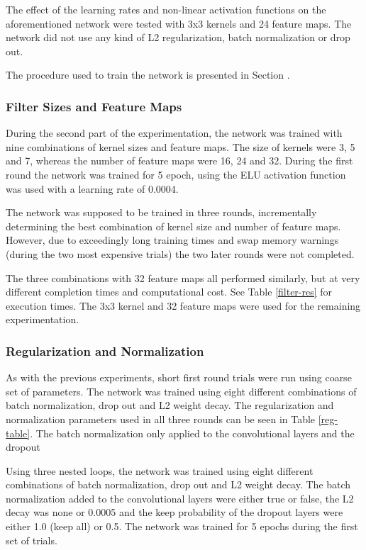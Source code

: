 \documentclass[]{article}
\begin{document}
The effect of the learning rates and non-linear activation functions on the aforementioned network were tested with 3x3 kernels and 24 feature maps. The network did not use any kind of L2 regularization, batch normalization or drop out. 

The procedure used to train the network is presented in Section .

\subsubsection{Filter Sizes and Feature Maps} \label{filter-methods} 

During the second part of the experimentation, the network was trained with nine combinations of kernel sizes and feature maps. The size of kernels were 3, 5 and 7, whereas the number of feature maps were 16, 24 and 32. During the first round the network was trained for 5 epoch, using the ELU activation function was used with a learning rate of 0.0004. 

The network was supposed to be trained in three rounds, incrementally determining the best combination of kernel size and number of feature maps. However, due to exceedingly long training times and swap memory warnings (during the two most expensive trials) the two later rounds were not completed. 

The three combinations with 32 feature maps all performed similarly, but at very different completion times and computational cost. See Table \ref{filter-res} for execution times. The 3x3 kernel and 32 feature maps were used for the remaining experimentation. 

\subsubsection{Regularization and Normalization}

As with the previous experiments, short first round trials were run using coarse set of parameters. The network was trained using eight different combinations of batch normalization, drop out and L2 weight decay. The regularization and normalization parameters used in all three rounds can be seen in Table \ref{reg-table}. The batch normalization only applied to the convolutional layers and the dropout 

Using three nested loops, the network was trained using eight different combinations of batch normalization, drop out and L2 weight decay. The batch normalization added to the convolutional layers were either true or false, the L2 decay was none or 0.0005 and the keep probability of the dropout layers were either 1.0 (keep all) or 0.5. The network was trained for 5 epochs during the first set of trials. 
\end{document}
